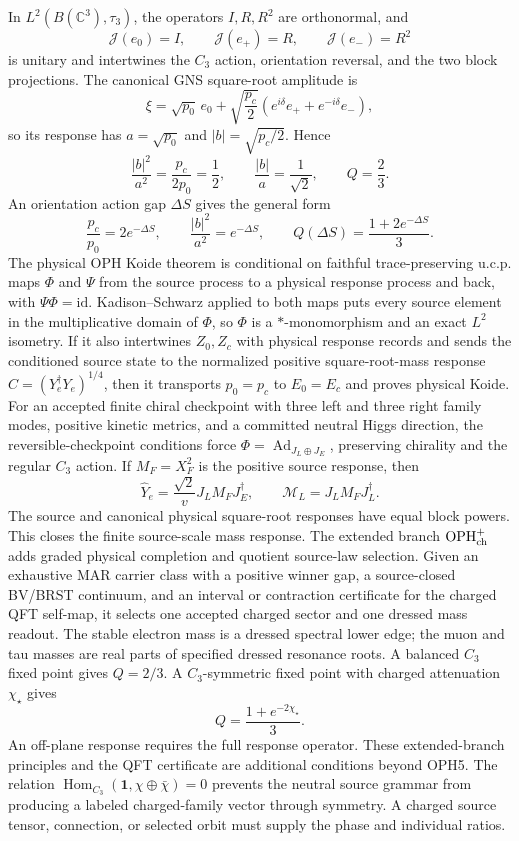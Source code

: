 \documentclass[11pt]{article}
\begin{document}
In \(L^2(B(\mathbb C^3),\tau_3)\), the operators \(I,R,R^2\) are orthonormal, and
\[
\mathcal J(e_0)=I,
\qquad
\mathcal J(e_+)=R,
\qquad
\mathcal J(e_-)=R^2
\]
is unitary and intertwines the \(C_3\) action, orientation reversal, and the two block projections.
The canonical GNS square-root amplitude is
\[
\xi=\sqrt{p_0}\,e_0+\sqrt{\frac{p_c}{2}}
\left(e^{i\delta}e_++e^{-i\delta}e_-\right),
\]
so its response has \(a=\sqrt{p_0}\) and \(|b|=\sqrt{p_c/2}\).  Hence
\[
\frac{|b|^2}{a^2}=\frac{p_c}{2p_0}=\frac12,
\qquad
\frac{|b|}{a}=\frac1{\sqrt2},
\qquad Q=\frac23.
\]
An orientation action gap \(\Delta S\) gives the general form
\[
\frac{p_c}{p_0}=2e^{-\Delta S},
\qquad
\frac{|b|^2}{a^2}=e^{-\Delta S},
\qquad
Q(\Delta S)=\frac{1+2e^{-\Delta S}}{3}.
\]
The physical OPH Koide theorem is conditional on faithful trace-preserving u.c.p. maps \(\Phi\)
and \(\Psi\) from the source process to a physical response process and back, with
\(\Psi\Phi=\mathrm{id}\). Kadison--Schwarz applied to both maps puts every source element in the
multiplicative domain of \(\Phi\), so \(\Phi\) is a \(*\)-monomorphism and an exact \(L^2\)
isometry. If it also intertwines \(Z_0,Z_c\) with physical response records and sends the
conditioned source state to the normalized positive square-root-mass response
\(C=(Y_e^\dagger Y_e)^{1/4}\), then it transports \(p_0=p_c\) to \(E_0=E_c\) and proves physical
Koide. For an accepted finite chiral checkpoint with three left and three right family modes,
positive kinetic metrics, and a committed neutral Higgs direction, the reversible-checkpoint
conditions force \(\Phi=\operatorname{Ad}_{J_L\oplus J_E}\), preserving chirality and the
regular \(C_3\) action. If \(M_F=X_F^2\) is the positive source response, then
\[
\widehat Y_e=\frac{\sqrt2}{v}J_LM_FJ_E^\dagger,
\qquad
\mathcal M_L=J_LM_FJ_L^\dagger.
\]
The source and canonical physical square-root responses have equal block powers. This closes the
finite source-scale mass response. The extended branch \(\mathrm{OPH}^{+}_{\rm ch}\) adds graded
physical completion and quotient source-law selection. Given an exhaustive MAR carrier class with
a positive winner gap, a source-closed BV/BRST continuum, and an interval or contraction
certificate for the charged QFT self-map, it selects one accepted charged sector and one dressed
mass readout. The stable electron mass is a dressed spectral lower edge; the muon and tau masses
are real parts of specified dressed resonance roots. A balanced \(C_3\) fixed point gives
\(Q=2/3\). A \(C_3\)-symmetric fixed point with charged attenuation \(\chi_\star\) gives
\[
Q=\frac{1+e^{-2\chi_\star}}{3}.
\]
An off-plane response requires the full response operator. These extended-branch principles and
the QFT certificate are additional conditions beyond OPH5.
The relation \(\operatorname{Hom}_{C_3}(\mathbf1,\chi\oplus\bar\chi)=0\) prevents the neutral
source grammar from producing a labeled charged-family vector through symmetry. A charged source
tensor, connection, or selected orbit must supply the phase and individual ratios.
\end{document}
